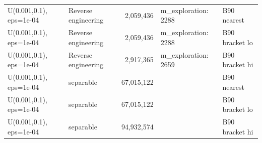\begin{tabular}{llrll}
U(0.001,0.1), eps=1e-04 & Reverse engineering & 2,059,436 & m\_exploration: 2288 & B90 nearest \\
U(0.001,0.1), eps=1e-04 & Reverse engineering & 2,059,436 & m\_exploration: 2288 & B90 bracket lo \\
U(0.001,0.1), eps=1e-04 & Reverse engineering & 2,917,365 & m\_exploration: 2659 & B90 bracket hi \\
U(0.001,0.1), eps=1e-04 & separable & 67,015,122 &  & B90 nearest \\
U(0.001,0.1), eps=1e-04 & separable & 67,015,122 &  & B90 bracket lo \\
U(0.001,0.1), eps=1e-04 & separable & 94,932,574 &  & B90 bracket hi \\
\bottomrule
\end{tabular}

